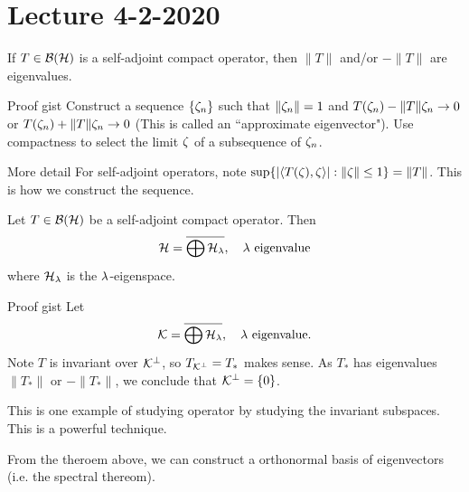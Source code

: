\section{Lecture 4-2-2020}
\begin{thm}
    If $T \in {\mathcal B}({\mathcal H})$ is a self-adjoint compact operator, then $\|T\|$ and/or $-\|T\|$ are eigenvalues.
\end{thm}
\begin{details}{Proof gist}
    Construct a sequence $\{\zeta_n\}$ such that $\|\zeta_n\| = 1$ and $T(\zeta_n) - \|T\|\zeta_n \rightarrow 0$ or $T(\zeta_n) + \|T\|\zeta_n \rightarrow 0$ (This is called an ``approximate eigenvector"). Use compactness to select the limit $\zeta$ of a subsequence of $\zeta_n$.
\end{details}
\begin{details}{More detail}
    For self-adjoint operators, note $ \sup\{|\langle T(\zeta), \zeta\rangle|: \|\zeta\| \leq 1\} = \|T\|$. This is how we construct the sequence.
\end{details}
\begin{thm}
    Let $T \in {\mathcal B}({\mathcal H})$ be a self-adjoint compact operator. Then
    \[
        {\mathcal H} = \overline{\bigoplus {\mathcal H}_\lambda}, \quad \lambda \ \text{eigenvalue}
    \]
    where ${\mathcal H}_\lambda$ is the $\lambda$-eigenspace.
\end{thm}
\begin{details}{Proof gist}
    Let
    \[
        {\mathcal K} = \overline{\bigoplus {\mathcal H}_\lambda}, \quad \lambda \ \text{eigenvalue}.
    \]
    Note $T$ is invariant over ${\mathcal K}^\perp$, so $T_{{\mathcal K}^\perp} = T_*$ makes sense. As $T_*$ has eigenvalues $\|T_*\|$ or $-\|T_*\|$, we conclude that ${\mathcal K}^{\perp} = \{0\}$.
\end{details}
\begin{remark}
    This is one example of studying operator by studying the invariant subspaces. This is a powerful technique.
\end{remark}
From the theroem above, we can construct a orthonormal basis of eigenvectors (i.e. the spectral thereom).
